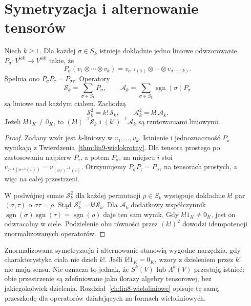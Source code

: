 \section{Symetryzacja i alternowanie tensorów}
\label{sec:lin10-projekcje}

\begin{stwierdzenie}
\label{prop:lin10-permutacje}
Niech \(k\ge1\).
Dla każdej \(\sigma\in S_k\)
istnieje dokładnie jedno liniowe
odwzorowanie
\(P_\sigma\colon V^{\otimes k}\to V^{\otimes k}\)
takie, że
\[
 P_\sigma(v_1\otimes\cdots\otimes v_k)
 =v_{\sigma^{-1}(1)}\otimes\cdots
  \otimes v_{\sigma^{-1}(k)}.
\]
Spełnia ono
\(P_\sigma P_\tau=P_{\sigma\tau}\).
Operatory
\[
 \mathcal S_k=\sum_{\sigma\in S_k}P_\sigma,
 \qquad
 \mathcal A_k=\sum_{\sigma\in S_k}
                \operatorname{sgn}(\sigma)P_\sigma
\]
są liniowe nad każdym ciałem.
Zachodzą
\[
 \mathcal S_k^2=k!\,\mathcal S_k,\qquad
 \mathcal A_k^2=k!\,\mathcal A_k.
\]
Jeżeli \(k!1_K\ne0_K\),
to \((k!)^{-1}\mathcal S_k\)
i \((k!)^{-1}\mathcal A_k\)
są rzutowaniami liniowymi.
\end{stwierdzenie}
\begin{proof}
Zadany wzór jest \(k\)-liniowy
w \(v_1,\ldots,v_k\).
Istnienie i jednoznaczność
\(P_\sigma\) wynikają z
Twierdzenia~\ref{thm:lin9-wielokrotny}.
Dla tensora prostego po
zastosowaniu najpierw \(P_\tau\),
a potem \(P_\sigma\),
na miejscu \(i\) stoi
\(v_{\tau^{-1}(\sigma^{-1}(i))}
=v_{(\sigma\tau)^{-1}(i)}\).
Otrzymujemy
\(P_\sigma P_\tau=P_{\sigma\tau}\)
na tensorach prostych, a więc
na całej przestrzeni.

W podwójnej sumie
\(\mathcal S_k^2\)
dla każdej permutacji
\(\rho\in S_k\) występuje
dokładnie \(k!\) par
\((\sigma,\tau)\) o \(\sigma\tau=\rho\).
Stąd \(\mathcal S_k^2=k!\mathcal S_k\).
Dla \(\mathcal A_k\) dodatkowy
współczynnik
\(\operatorname{sgn}(\sigma)
\operatorname{sgn}(\tau)
=\operatorname{sgn}(\rho)\)
daje ten sam wynik.
Gdy \(k!1_K\ne0_K\),
jest on odwracalny w ciele.
Podzielenie obu równości
przez \((k!)^2\) dowodzi
idempotencji znormalizowanych
operatorów.
\end{proof}

\begin{uwaga}
\label{rem:lin10-kchar}
Znormalizowana symetryzacja
i alternowanie stanowią
wygodne narzędzia, gdy
charakterystyka ciała nie dzieli \(k!\).
Jeśli \(k!1_K=0_K\),
wzory z dzieleniem przez \(k!\)
nie mają sensu.
Nie oznacza to jednak, że
\(S^k(V)\) lub \(\Lambda^k(V)\)
przestają istnieć:
obie przestrzenie są
zdefiniowane jako ilorazy
algebry tensorowej, bez
jakiegokolwiek dzielenia.
Rozdział~\ref{ch:lin8-wieloliniowe}
opisuje tę samą przeszkodę
dla operatorów działających
na formach wieloliniowych.
\end{uwaga}

